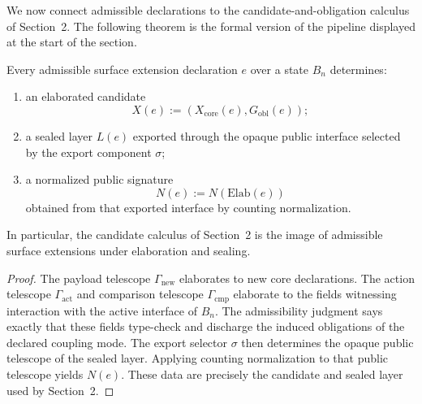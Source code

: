 We now connect admissible declarations to the candidate-and-obligation calculus of
Section~2.  The following theorem is the formal version of the pipeline displayed at the
start of the section.

\begin{theorem}
Every admissible surface extension declaration \(e\) over a state \(B_n\) determines:
\begin{enumerate}
\item an elaborated candidate
\[
  X(e) := (X_{\mathrm{core}}(e),G_{\mathrm{obl}}(e));
\]
\item a sealed layer \(L(e)\) exported through the opaque public interface selected by the
export component \(\sigma\);
\item a normalized public signature
\[
  N(e) := N(\mathrm{Elab}(e))
\]
obtained from that exported interface by counting normalization.
\end{enumerate}
In particular, the candidate calculus of Section~2 is the image of admissible surface
extensions under elaboration and sealing.
\end{theorem}

\begin{proof}
The payload telescope \(\Gamma_{\mathrm{new}}\) elaborates to new core declarations.  The
action telescope \(\Gamma_{\mathrm{act}}\) and comparison telescope \(\Gamma_{\mathrm{cmp}}\)
elaborate to the fields witnessing interaction with the active interface of \(B_n\).  The
admissibility judgment says exactly that these fields type-check and discharge the induced
obligations of the declared coupling mode.  The export selector \(\sigma\) then determines the
opaque public telescope of the sealed layer.  Applying counting normalization to that public
telescope yields \(N(e)\).  These data are precisely the candidate and sealed layer used by
Section~2.
\end{proof}

